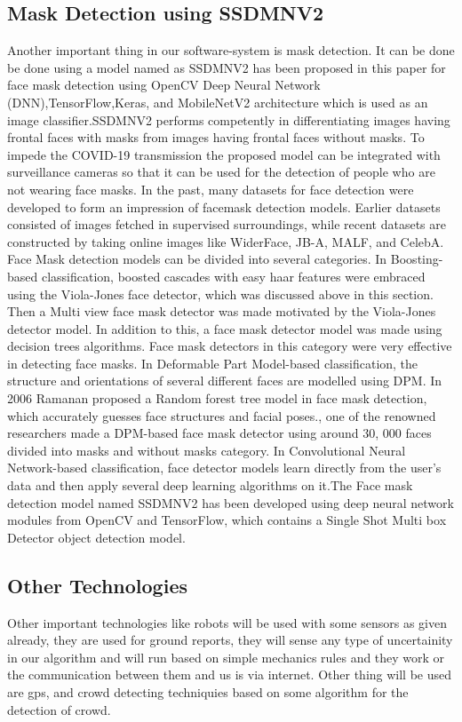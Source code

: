\documentclass[10pt,twocolumn,letterpaper]{article}
\begin{document}
\subsection{Mask Detection using SSDMNV2}
Another important thing in our software-system is mask detection. It can be done be done using a model named as SSDMNV2 has been proposed in this paper for face mask detection using OpenCV Deep Neural Network (DNN),TensorFlow,Keras, and MobileNetV2 architecture which is used as an image classifier.SSDMNV2 performs   competently in differentiating images having frontal faces with masks from images having frontal faces without masks. To impede the COVID-19 transmission the proposed model can be integrated with surveillance cameras so that it can be used for the detection of people who are not wearing face masks. In the past, many datasets for face detection were developed to form an impression of facemask detection models. Earlier datasets consisted of images fetched in supervised surroundings, while recent datasets are constructed by taking online images like WiderFace, JB-A, MALF, and CelebA. Face Mask detection models can be divided into several categories. In Boosting-based classification, boosted cascades with easy haar features were embraced using the Viola-Jones face detector, which was discussed above in this section. Then a Multi view face mask detector was made motivated by the Viola-Jones detector model. In addition to this, a face mask detector model was made using decision trees algorithms. Face mask detectors in this category were very effective in detecting face masks.
In Deformable Part Model-based classification, the structure and orientations of several different faces are modelled using DPM. In 2006 Ramanan proposed a Random forest tree model in face mask detection, which accurately guesses face structures and facial poses., one of the renowned researchers made a DPM-based face mask detector using around 30, 000 faces divided into masks and without masks category.
In Convolutional Neural Network-based classification, face detector models learn directly from the user's data and then apply several deep learning algorithms on it.The Face mask detection model named SSDMNV2 has been developed using deep neural network modules from OpenCV and TensorFlow, which contains a Single Shot Multi box Detector object detection model.


\subsection{Other Technologies}
Other important technologies like robots will be used with some sensors as given already, they are used for ground reports, they will sense any type of uncertainity in our algorithm and will run based on simple mechanics rules and they work or the communication between them and us is via internet. Other thing will be used are gps, and crowd detecting techniquies based on some algorithm for the detection of crowd.
\end{document}
